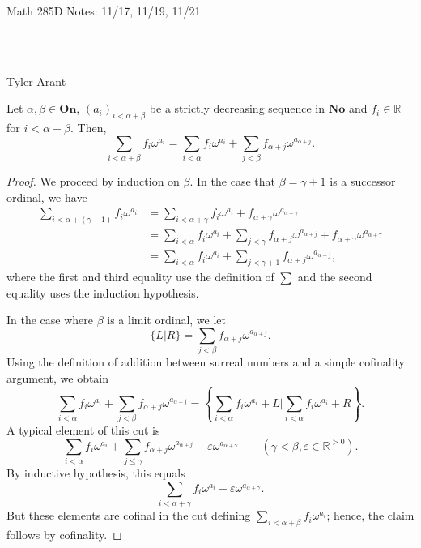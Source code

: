 \begin{center} \begin{Large} Math 285D Notes: 11/17, 11/19, 11/21 \end{Large}\\
\text{} \\
\begin{large} Tyler Arant  \end{large}
\end{center}

\begin{lemma}[Associativity] \label{6.7} Let $\alpha, \beta \in \textbf{On}$, $(a_i)_{i<\alpha+\beta}$ be a strictly decreasing sequence in $\textbf{No}$ and $f_i\in \mathds{R}$ for $i<\alpha+\beta$.  Then,
$$\sum_{i<\alpha+\beta} f_i\omega^{a_i}=\sum_{i<\alpha} f_i\omega^{a_i} + \sum_{j<\beta}f_{\alpha+j}\omega^{a_{\alpha+j}}.$$
\end{lemma}

\begin{proof} We proceed by induction on $\beta$.  In the case that $\beta=\gamma+1$ is a successor ordinal, we have
\begin{align*} \sum_{i<\alpha+(\gamma+1)} f_i\omega^{a_i}&= \sum_{i<\alpha+\gamma} f_i\omega^{a_i} + f_{\alpha+\gamma}\omega^{a_{\alpha+\gamma}} \\
		&= \sum_{i<\alpha} f_i\omega^{a_i}+ \sum_{j<\gamma} f_{\alpha+j} \omega^{a_{\alpha+j}}+ f_{\alpha+\gamma}\omega^{a_{\alpha+\gamma}}\\
		& = \sum_{i<\alpha} f_i\omega^{a_i} + \sum_{j<\gamma+1}f_{\alpha+j}\omega^{a_{\alpha+j}}, \end{align*}
where the first and third equality use the definition of $\sum$ and the second equality uses the induction hypothesis.  

In the case where $\beta$ is a limit ordinal, we let 
$$\{L | R\} = \sum_{j<\beta}f_{\alpha+j}\omega^{a_{\alpha+j}}.$$
Using the definition of addition between surreal numbers and a simple cofinality argument, we obtain
$$\sum_{i<\alpha}f_i\omega^{a_i} + \sum_{j<\beta}f_{\alpha+j}\omega^{a_{\alpha+j}} = \left \{\sum_{i<\alpha}f_i\omega^{a_i} + L \biggl | \sum_{i<\alpha}f_i\omega^{a_i} + R \right \}.$$
A typical element of this cut is 
$$\sum_{i<\alpha}f_i\omega^{a_i} + \sum_{j\leq \gamma} f_{\alpha+j}\omega^{a_{\alpha+j}}-\varepsilon \omega^{a_{\alpha+\gamma}}  \qquad (\gamma<\beta, \varepsilon \in \mathds{R}^{>0}).$$
By inductive hypothesis, this equals
$$\sum_{i<\alpha+\gamma}f_i \omega^{a_i}- \varepsilon \omega^{a_{\alpha+\gamma}}.$$
But these elements are cofinal in the cut defining $\sum_{i<\alpha+\beta} f_i\omega^{a_i}$; hence, the claim follows by cofinality. 
\end{proof}

